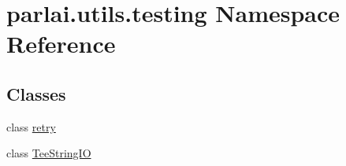 \hypertarget{namespaceparlai_1_1utils_1_1testing}{}\section{parlai.\+utils.\+testing Namespace Reference}
\label{namespaceparlai_1_1utils_1_1testing}
\subsection*{Classes}
\begin{DoxyCompactItemize}
\item 
class \hyperlink{classparlai_1_1utils_1_1testing_1_1retry}{retry}
\item 
class \hyperlink{classparlai_1_1utils_1_1testing_1_1TeeStringIO}{Tee\+String\+IO}
\end{DoxyCompactItemize}
